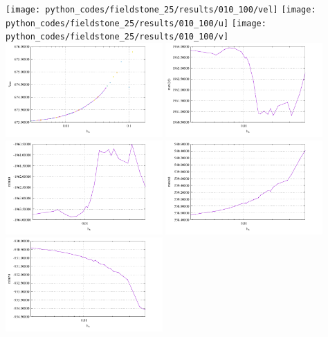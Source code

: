 \begin{center}
\texttt{[image: python\_codes/fieldstone\_25/results/010\_100/vel]}
\texttt{[image: python\_codes/fieldstone\_25/results/010\_100/u]}
\texttt{[image: python\_codes/fieldstone\_25/results/010\_100/v]}\\
\includegraphics[width=6cm]{python_codes/fieldstone_25/results/vrms_010.pdf}
\includegraphics[width=6cm]{python_codes/fieldstone_25/results/max_vel_010.pdf}\\
\includegraphics[width=6cm]{python_codes/fieldstone_25/results/min_u_010.pdf}
\includegraphics[width=6cm]{python_codes/fieldstone_25/results/max_u_010.pdf}\\
\includegraphics[width=6cm]{python_codes/fieldstone_25/results/min_v_010.pdf}

\end{center}
